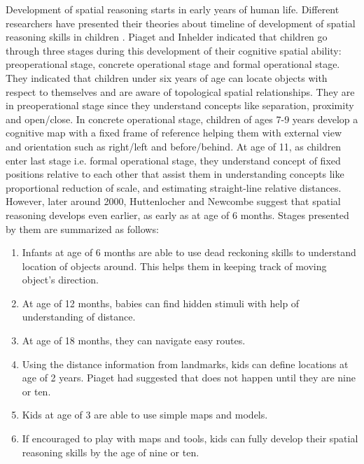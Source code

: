 Development of spatial reasoning starts in early years of human life. Different researchers have presented their theories about timeline of development of spatial reasoning skills in children \parencite{yilmaz2017development}. Piaget and Inhelder \parencite{piaget1956child} indicated that children go through three stages during this development of their cognitive spatial ability: preoperational stage, concrete operational stage and formal operational stage. They indicated that children under six years of age can locate objects with respect to themselves and are aware of topological spatial relationships. They are in preoperational stage since they understand concepts like separation, proximity and open/close. In concrete operational stage, children of ages 7-9 years develop a cognitive map with a fixed frame of reference helping them with external view and orientation such as right/left and before/behind. At age of 11, as children enter last stage i.e. formal operational stage, they understand concept of fixed positions relative to each other that assist them in understanding concepts like proportional reduction of scale, and estimating straight-line relative distances. \\
However, later around 2000, Huttenlocher and Newcombe \parencite{huttenlocher1999spatial} suggest that spatial reasoning develops even earlier, as early as at age of 6 months. Stages presented by them are summarized as follows\parencite{yilmaz2017development}: 
\begin{enumerate}
    \item Infants at age of 6 months are able to use dead reckoning skills to understand location of objects around. This helps them in keeping track of moving object's direction.
    \item At age of 12 months, babies can find hidden stimuli with help of understanding of distance.
    \item At age of 18 months, they can navigate easy routes.
    \item Using the distance information from landmarks, kids can define locations at age of 2 years. Piaget had suggested that does not happen until they are nine or ten. 
    \item Kids at age of 3 are able to use simple maps and models.
    \item If encouraged to play with maps and tools, kids can fully develop their spatial reasoning skills by the age of nine or ten. 
\end{enumerate}
